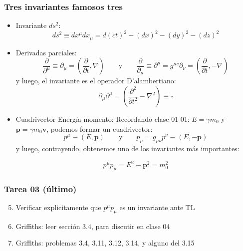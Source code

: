 \documentclass[xetex,mathserif,serif,10pt]{beamer}
\begin{document}
\begin{frame}
  \frametitle{Tres invariantes famosos tres}
  \begin{itemize}
    \item \alert{Invariante $ds^2$}:
      \begin{equation}
        ds^2 \equiv dx^\mu dx_\mu = d(ct)^2 - (dx)^2 - (dy)^2 - (dz)^2
      \end{equation}
    \item \alert{Derivadas parciales}:
      \begin{equation}
        \frac{\partial}{\partial^\mu} \equiv \partial_\mu = \left( \frac{\partial}{\partial t}, \nabla \right)
        \qquad \mathrm{y} \qquad
        \frac{\partial}{\partial_\mu} \equiv \partial^\mu = g^{\mu\nu} \partial_\nu = \left(\frac{\partial}{\partial t}, -\nabla \right)
      \end{equation}
      y luego, el invariante es el operador \alert{D'alambertiano}:
      \begin{equation}
        \partial_\mu \partial^\mu = \left(\frac{\partial^2}{\partial t^2} - \nabla^2 \right) \equiv \square
      \end{equation}
    \item \alert{Cuadrivector Energía-momento}: Recordando clase 01-01: $E=\gamma m_0$ y $\mathbf{p}=\gamma m_0 \mathbf{v}$, podemos formar un cuadrivector:
      \begin{equation}
        p^\mu \equiv (E,\mathbf{p}) \qquad \mathrm{y} \qquad  p_\mu = g_{\mu\nu} p^\nu \equiv (E,-\mathbf{p})
      \end{equation}
      y luego, contrayendo, obtenemos uno de los invariantes más importantes:
      \begin{alertblock}{
          \begin{equation}
            p^\mu p_\mu = E^2 -\mathbf{p}^2 = m_0^2
          \end{equation}
      }
    \end{alertblock}
  \end{itemize}
\end{frame}

\begin{frame}
  \frametitle{\alert{Tarea 03 (último)}}
  \begin{enumerate}\setcounter{enumi}{04}
    \item Verificar explicitamente que $p^\mu p_\mu$ es un invariante ante TL
    \item Griffiths: leer sección 3.4, para discutir en clase 04
    \item Griffiths: problemas 3.4, 3.11, 3.12, 3.14, y alguno del 3.15
  \end{enumerate}
\end{frame}
\end{document}
